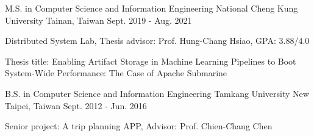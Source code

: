 

\begin{cventries}

  \cventry
    {M.S. in Computer Science and Information Engineering} %
    {National Cheng Kung University} %
    {Tainan, Taiwan} %
    {Sept. 2019 - Aug. 2021} %
    {
      \begin{cvitems} %
        \item {Distributed System Lab, Thesis advisor: Prof. Hung-Chang Hsiao, GPA: 3.88/4.0}
        \item {Thesis title: Enabling Artifact Storage in Machine Learning Pipelines to Boot \\
		System-Wide Performance: The Case of Apache Submarine}
      \end{cvitems}
    }

  \cventry
    {B.S. in Computer Science and Information Engineering} %
    {Tamkang University} %
    {New Taipei, Taiwan} %
    {Sept. 2012 - Jun. 2016} %
    {
      \begin{cvitems} %
        \item {Senior project: A trip planning APP, Advisor: Prof. Chien-Chang Chen}
      \end{cvitems}
    }

\end{cventries}
